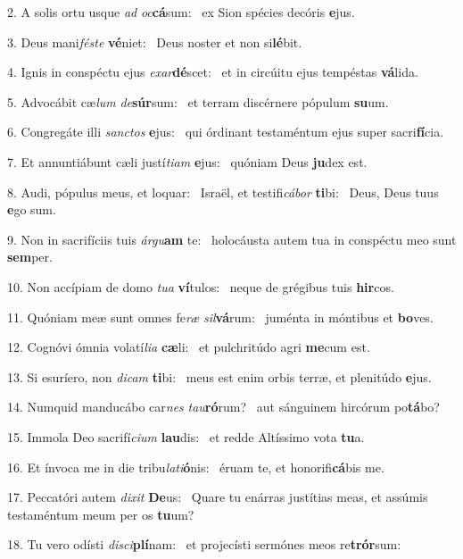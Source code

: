 2. A solis ortu usque \textit{ad} \textit{oc}\textbf{cá}sum: \ast\  ex Sion spécies decóris \textbf{e}jus.\

3. Deus mani\textit{fés}\textit{te} \textbf{vé}niet: \ast\  Deus noster et non si\textbf{lé}bit.\

4. Ignis in conspéctu ejus \textit{ex}\textit{ar}\textbf{dé}scet: \ast\  et in circúitu ejus tempéstas \textbf{vá}lida.\

5. Advocábit cæ\textit{lum} \textit{de}\textbf{súr}sum: \ast\  et terram discérnere pópulum \textbf{su}um.\

6. Congregáte illi \textit{sanc}\textit{tos} \textbf{e}jus: \ast\  qui órdinant testaméntum ejus super sacri\textbf{fí}cia.\

7. Et annuntiábunt cæli justí\textit{ti}\textit{am} \textbf{e}jus: \ast\  quóniam Deus \textbf{ju}dex est.\

8. Audi, pópulus meus, et loquar: \dag\  Israël, et testifi\textit{cá}\textit{bor} \textbf{ti}bi: \ast\  Deus, Deus tuus \textbf{e}go sum.\

9. Non in sacrifíciis tuis \textit{ár}\textit{gu}\textbf{am} te: \ast\  holocáusta autem tua in conspéctu meo sunt \textbf{sem}per.\

10. Non accípiam de domo \textit{tu}\textit{a} \textbf{ví}tulos: \ast\  neque de grégibus tuis \textbf{hir}cos.\

11. Quóniam meæ sunt omnes fe\textit{ræ} \textit{sil}\textbf{vá}rum: \ast\  juménta in móntibus et \textbf{bo}ves.\

12. Cognóvi ómnia volatí\textit{li}\textit{a} \textbf{cæ}li: \ast\  et pulchritúdo agri \textbf{me}cum est.\

13. Si esuríero, non \textit{di}\textit{cam} \textbf{ti}bi: \ast\  meus est enim orbis terræ, et plenitúdo \textbf{e}jus.\

14. Numquid manducábo car\textit{nes} \textit{tau}\textbf{ró}rum? \ast\  aut sánguinem hircórum po\textbf{tá}bo?\

15. Immola Deo sacrifí\textit{ci}\textit{um} \textbf{lau}dis: \ast\  et redde Altíssimo vota \textbf{tu}a.\

16. Et ínvoca me in die tribu\textit{la}\textit{ti}\textbf{ó}nis: \ast\  éruam te, et honorifi\textbf{cá}bis me.\

17. Peccatóri autem \textit{di}\textit{xit} \textbf{De}us: \ast\  Quare tu enárras justítias meas, et assúmis testaméntum meum per os \textbf{tu}um?\

18. Tu vero odísti \textit{di}\textit{sci}\textbf{plí}nam: \ast\  et projecísti sermónes meos re\textbf{trór}sum:\

